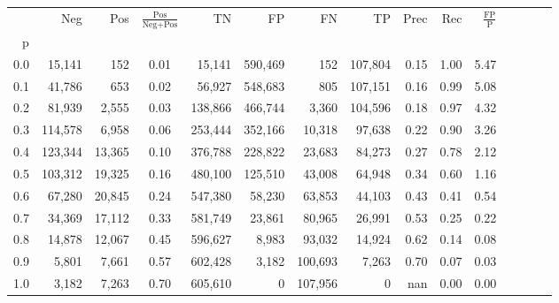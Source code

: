 \begin{tabular}{rrrcrrrrrrrrrrr}
\toprule
{} &      Neg &     Pos & $\frac{\text{Pos}}{\text{Neg}+\text{Pos}}$ &       TN &       FP &       FN &       TP &  Prec &   Rec & $\frac{\text{FP}}{\text{P}}$ \\
p   &          &         &                                            &          &          &          &          &       &       &                              \\
\midrule
0.0 &   15,141 &     152 &                                       0.01 &   15,141 &  590,469 &      152 &  107,804 &  0.15 &  1.00 &                         5.47 \\
0.1 &   41,786 &     653 &                                       0.02 &   56,927 &  548,683 &      805 &  107,151 &  0.16 &  0.99 &                         5.08 \\
0.2 &   81,939 &   2,555 &                                       0.03 &  138,866 &  466,744 &    3,360 &  104,596 &  0.18 &  0.97 &                         4.32 \\
0.3 &  114,578 &   6,958 &                                       0.06 &  253,444 &  352,166 &   10,318 &   97,638 &  0.22 &  0.90 &                         3.26 \\
0.4 &  123,344 &  13,365 &                                       0.10 &  376,788 &  228,822 &   23,683 &   84,273 &  0.27 &  0.78 &                         2.12 \\
0.5 &  103,312 &  19,325 &                                       0.16 &  480,100 &  125,510 &   43,008 &   64,948 &  0.34 &  0.60 &                         1.16 \\
0.6 &   67,280 &  20,845 &                                       0.24 &  547,380 &   58,230 &   63,853 &   44,103 &  0.43 &  0.41 &                         0.54 \\
0.7 &   34,369 &  17,112 &                                       0.33 &  581,749 &   23,861 &   80,965 &   26,991 &  0.53 &  0.25 &                         0.22 \\
0.8 &   14,878 &  12,067 &                                       0.45 &  596,627 &    8,983 &   93,032 &   14,924 &  0.62 &  0.14 &                         0.08 \\
0.9 &    5,801 &   7,661 &                                       0.57 &  602,428 &    3,182 &  100,693 &    7,263 &  0.70 &  0.07 &                         0.03 \\
1.0 &    3,182 &   7,263 &                                       0.70 &  605,610 &        0 &  107,956 &        0 &   nan &  0.00 &                         0.00 \\
\bottomrule
\end{tabular}
